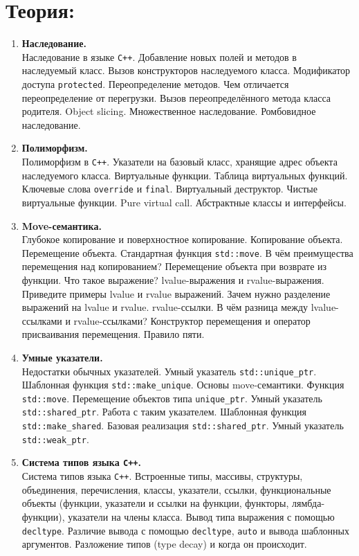 \documentclass{article}
\begin{document}

\section*{Теория:}
\begin{enumerate}


\item \textbf{Наследование.}\\
Наследование в языке \texttt{C++}. Добавление новых полей и методов в наследуемый класс. Вызов конструкторов наследуемого класса. Модификатор доступа \texttt{protected}. Переопределение методов. Чем отличается переопределение от перегрузки. Вызов переопределённого метода класса родителя. Object slicing. Множественное наследование. Ромбовидное наследование.

\item \textbf{Полиморфизм.}\\
Полиморфизм в \texttt{C++}. Указатели на базовый класс, хранящие адрес объекта наследуемого класса.  Виртуальные функции. Таблица виртуальных функций. Ключевые слова \texttt{override} и \texttt{final}. Виртуальный деструктор. Чистые виртуальные функции. Pure virtual call. Абстрактные классы и интерфейсы.

\item \textbf{Move-семантика.}\\
Глубокое копирование и поверхностное копирование. Копирование объекта. Перемещение объекта. Стандартная функция \texttt{std::move}. В чём преимущества перемещения над копированием? Перемещение объекта при возврате из функции. Что такое выражение? lvalue-выражения и rvalue-выражения. Приведите примеры lvalue и rvalue выражений. Зачем нужно разделение выражений на lvalue и rvalue. rvalue-ссылки. В чём разница между lvalue-ссылками и rvalue-ссылками? Конструктор перемещения и оператор присваивания перемещения. Правило пяти.

\item \textbf{Умные указатели.}\\
Недостатки обычных указателей. Умный указатель \texttt{std::unique\_ptr}. Шаблонная функция \texttt{std::make\_unique}. Основы move-семантики. Функция \texttt{std::move}. Перемещение объектов типа \texttt{unique\_ptr}. Умный указатель \texttt{std::shared\_ptr}. Работа с таким указателем. Шаблонная функция \texttt{std::make\_shared}. Базовая реализация \texttt{std::shared\_ptr}. Умный указатель \texttt{std::weak\_ptr}.

\item \textbf{Система типов языка \texttt{C++}.}\\
Система типов языка \texttt{C++}. Встроенные типы, массивы, структуры, объединения, перечисления, классы, указатели, ссылки, функциональные объекты (функции, указатели и ссылки на функции, функторы, лямбда-функции), указатели на члены класса. Вывод типа выражения с помощью \texttt{decltype}. Различие вывода с помощью \texttt{decltype}, \texttt{auto} и вывода шаблонных аргументов. Разложение типов (type decay) и когда он происходит.



\end{enumerate}
\end{document}
